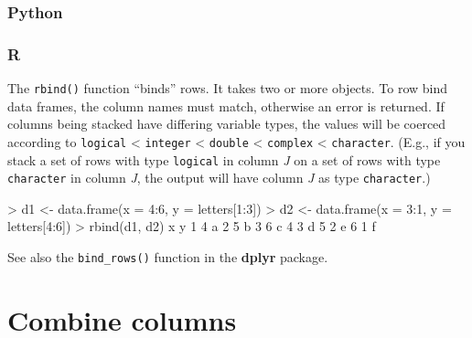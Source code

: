 \documentclass[
]{book}
\newenvironment{Shaded}{\begin{snugshade}}{\end{snugshade}}
\newcommand{\AttributeTok}[1]{\textcolor[rgb]{0.77,0.63,0.00}{#1}}
\newcommand{\DecValTok}[1]{\textcolor[rgb]{0.00,0.00,0.81}{#1}}
\newcommand{\FunctionTok}[1]{\textcolor[rgb]{0.00,0.00,0.00}{#1}}
\newcommand{\NormalTok}[1]{#1}
\newcommand{\OtherTok}[1]{\textcolor[rgb]{0.56,0.35,0.01}{#1}}
\newcommand{\SpecialCharTok}[1]{\textcolor[rgb]{0.00,0.00,0.00}{#1}}
\begin{document}
\hypertarget{python-28}{%
\subsubsection*{Python}\label{python-28}}

\hypertarget{r-28}{%
\subsubsection*{R}\label{r-28}}

The \texttt{rbind()} function ``binds'' rows. It takes two or more objects. To row bind data frames, the column names must match, otherwise an error is returned. If columns being stacked have differing variable types, the values will be coerced according to \texttt{logical} \textless{} \texttt{integer} \textless{} \texttt{double} \textless{} \texttt{complex} \textless{} \texttt{character}. (E.g., if you stack a set of rows with type \texttt{logical} in column \emph{J} on a set of rows with type \texttt{character} in column \emph{J}, the output will have column \emph{J} as type \texttt{character}.)

\begin{Shaded}
\begin{Highlighting}[]
\SpecialCharTok{\textgreater{}}\NormalTok{ d1 }\OtherTok{\textless{}{-}} \FunctionTok{data.frame}\NormalTok{(}\AttributeTok{x =} \DecValTok{4}\SpecialCharTok{:}\DecValTok{6}\NormalTok{, }\AttributeTok{y =}\NormalTok{ letters[}\DecValTok{1}\SpecialCharTok{:}\DecValTok{3}\NormalTok{])}
\SpecialCharTok{\textgreater{}}\NormalTok{ d2 }\OtherTok{\textless{}{-}} \FunctionTok{data.frame}\NormalTok{(}\AttributeTok{x =} \DecValTok{3}\SpecialCharTok{:}\DecValTok{1}\NormalTok{, }\AttributeTok{y =}\NormalTok{ letters[}\DecValTok{4}\SpecialCharTok{:}\DecValTok{6}\NormalTok{])}
\SpecialCharTok{\textgreater{}} \FunctionTok{rbind}\NormalTok{(d1, d2)}
\NormalTok{  x y}
\DecValTok{1} \DecValTok{4}\NormalTok{ a}
\DecValTok{2} \DecValTok{5}\NormalTok{ b}
\DecValTok{3} \DecValTok{6}\NormalTok{ c}
\DecValTok{4} \DecValTok{3}\NormalTok{ d}
\DecValTok{5} \DecValTok{2}\NormalTok{ e}
\DecValTok{6} \DecValTok{1}\NormalTok{ f}
\end{Highlighting}
\end{Shaded}

See also the \texttt{bind\_rows()} function in the \textbf{dplyr} package.

\hypertarget{combine-columns}{%
\section{Combine columns}\label{combine-columns}}
\end{document}
